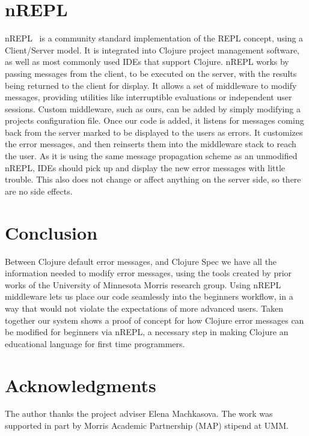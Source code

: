 \documentclass[12pt]{article}
\begin{document}
\section{nREPL}
nREPL~\cite{nrepl} is a community standard implementation of the REPL concept,
 using a
\newline
Client/Server model. 
It is integrated into Clojure project management software, as well as most commonly used IDEs
that support Clojure. 
nREPL works by passing messages from the client, to be executed on the server, with the results
being returned to the client for display.
It allows a set of middleware to modify messages, providing utilities
like interruptible evaluations or independent user sessions.
Custom middleware, such as ours, can be added by simply
modifying a projects configuration file. Once our code is added,
it listens for messages coming back from the server
marked to be displayed to the users as errors.
It customizes the error messages, and then reinserts them into the middleware stack
to reach the user. As it is using the same message propagation scheme as an unmodified nREPL,
IDEs should pick up and display the new error messages with little trouble.
This also does not change or affect anything on the server side, so there are no side effects.

\section{Conclusion}
Between Clojure default error messages, and Clojure Spec
we have all the information needed to modify error messages, using the
tools created by prior works of the University of Minnesota Morris research group. %
Using nREPL middleware lets us place our code seamlessly into the beginners
workflow, in a way that would not violate the expectations of more advanced users.
 Taken together our system shows a proof of concept for how Clojure
error messages can be modified for beginners via nREPL, a necessary step in making
Clojure an educational language for first time programmers.


\section{Acknowledgments}
The author thanks the project adviser  Elena Machkasova.
The work was supported in part by Morris Academic Partnership (MAP) stipend at UMM.



\end{document}
